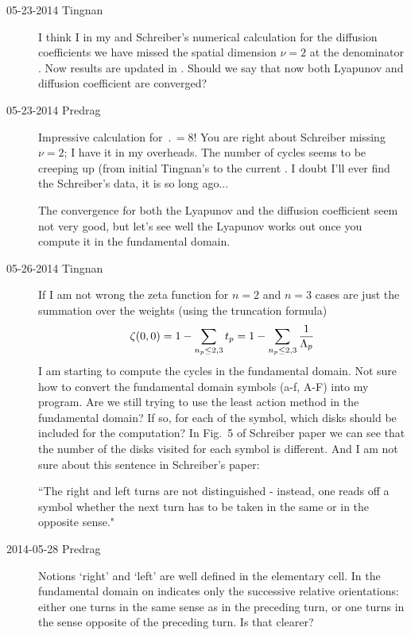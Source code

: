 \begin{description}
\item[05-23-2014 Tingnan]
I think I in my and Schreiber's numerical calculation for the diffusion
coefficients we have missed the spatial dimension $\nu=2$ at the
denominator . Now results are updated in
. Should we say that now both Lyapunov and diffusion
coefficient are converged?

\item[05-23-2014 Predrag]
Impressive calculation for $\period{}=8$!
You are right about Schreiber missing $\nu=2$; I have it in my overheads.
The number of cycles seems to be creeping
up (from initial Tingnan's  to the current .
I doubt I'll ever find the Schreiber's data, it is so long ago...

The convergence for both the Lyapunov and the diffusion
coefficient seem not very good, but let's see well the Lyapunov works out
once you compute it in the fundamental domain.

\item[05-26-2014 Tingnan]
If I am not wrong the zeta function for $n=2$ and $n=3$ cases are just the summation over the weights (using the truncation formula)
\[
\zeta(0,0)=1-\sum_{{n_{p}}\leq2,3}t_{p}=1-\sum_{{n_{p}}\leq2,3} \frac{1}{\Lambda_{p}}
\]
I am starting to compute the cycles in the fundamental domain.
Not sure how to convert the fundamental domain symbols (a-f, A-F) into my program. Are we still trying to use the least action method in the fundamental domain? If so, for each of the symbol, which disks should be included for the computation? In Fig.~5 of Schreiber paper we can see that the number of the disks visited for each symbol
is different. And I am not sure about this sentence in Schreiber's paper:

``The right and left turns are not distinguished - instead,  one reads
off a symbol whether the next turn has to be taken in the same or in the
opposite sense."

\item[2014-05-28 Predrag] Notions `right' and `left' are well defined in
the elementary cell. In the fundamental domain on indicates only the
successive relative orientations: either one turns in the same sense as
in the preceding turn, or one turns in the sense opposite of the
preceding turn. Is that clearer?


\end{description}
